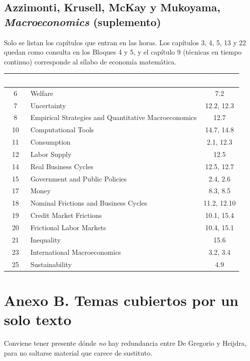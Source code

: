 \documentclass[11pt,a4paper]{article}
\newcommand{\cab}[1]{\textcolor{white}{\sffamily\bfseries #1}}
\newcommand{\filasalternas}{\rowcolors{2}{white}{tonoPalido}}
\begin{document}
\bigskip
\subsection*{Azzimonti, Krusell, McKay y Mukoyama, \emph{Macroeconomics} (suplemento)}
\noindent Solo se listan los capítulos que entran en las horas. Los capítulos 3,
4, 5, 13 y 22 quedan como consulta en los Bloques 4 y 5, y el capítulo 9
(técnicas en tiempo continuo) corresponde al sílabo de economía matemática.
\medskip

{\filasalternas
\noindent\begin{tabularx}{\textwidth}{cXc}
\toprule
\rowcolor{tonoOscuro}\cab{Cap.} & \cab{Título} & \cab{Tema} \\
\midrule
6 & Welfare & 7.2 \\
7 & Uncertainty & 12.2, 12.3 \\
8 & Empirical Strategies and Quantitative Macroeconomics & 12.7 \\
10 & Computational Tools & 14.7, 14.8 \\
11 & Consumption & 2.1, 12.3 \\
12 & Labor Supply & 12.5 \\
14 & Real Business Cycles & 12.5, 12.7 \\
15 & Government and Public Policies & 2.4, 2.6 \\
17 & Money & 8.3, 8.5 \\
18 & Nominal Frictions and Business Cycles & 11.2, 12.10 \\
19 & Credit Market Frictions & 10.1, 15.4 \\
20 & Frictional Labor Markets & 10.4, 15.1 \\
21 & Inequality & 15.6 \\
23 & International Macroeconomics & 3.2, 3.4 \\
25 & Sustainability & 4.9 \\
\bottomrule
\end{tabularx}
}

\newpage
\section*{Anexo B. Temas cubiertos por un solo texto}

Conviene tener presente dónde \emph{no} hay redundancia entre De Gregorio y
Heijdra, para no saltarse material que carece de sustituto.
\end{document}

